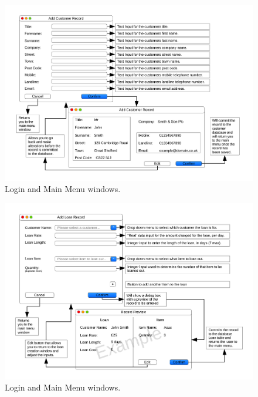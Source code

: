 \begin{landscape}
\newpage

\begin{figure}[H]
    \begin{center}
        \includegraphics[width=500px]{./Design/user_interface/Add_customer_record_interface.pdf}
    \end{center}
    \caption{Login and Main Menu windows.} \label{fig:print_function_result}
\end{figure}

\newpage

\begin{figure}[H]
    \begin{center}
        \includegraphics[width=500px]{./Design/user_interface/Add_loan_record_interface.pdf}
    \end{center}
    \caption{Login and Main Menu windows.} \label{fig:print_function_result}
\end{figure}


\end{landscape}
